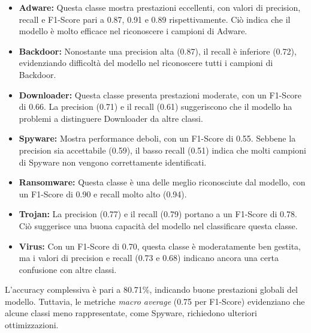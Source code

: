 \begin{itemize}
    \item \textbf{Adware:} Questa classe mostra prestazioni eccellenti, con valori di precision, recall e F1-Score pari a 0.87, 0.91 e 0.89 rispettivamente. Ciò indica che il modello è molto efficace nel riconoscere i campioni di Adware.
    \item \textbf{Backdoor:} Nonostante una precision alta (0.87), il recall è inferiore (0.72), evidenziando difficoltà del modello nel riconoscere tutti i campioni di Backdoor.
    \item \textbf{Downloader:} Questa classe presenta prestazioni moderate, con un F1-Score di 0.66. La precision (0.71) e il recall (0.61) suggeriscono che il modello ha problemi a distinguere Downloader da altre classi.
    \item \textbf{Spyware:} Mostra performance deboli, con un F1-Score di 0.55. Sebbene la precision sia accettabile (0.59), il basso recall (0.51) indica che molti campioni di Spyware non vengono correttamente identificati.
    \item \textbf{Ransomware:} Questa classe è una delle meglio riconosciute dal modello, con un F1-Score di 0.90 e recall molto alto (0.94).
    \item \textbf{Trojan:} La precision (0.77) e il recall (0.79) portano a un F1-Score di 0.78. Ciò suggerisce una buona capacità del modello nel classificare questa classe.
    \item \textbf{Virus:} Con un F1-Score di 0.70, questa classe è moderatamente ben gestita, ma i valori di precision e recall (0.73 e 0.68) indicano ancora una certa confusione con altre classi.
\end{itemize}
L'accuracy complessiva è pari a 80.71\%, indicando buone prestazioni globali del modello. Tuttavia, le metriche \textit{macro average} (0.75 per F1-Score) evidenziano che alcune classi meno rappresentate, come Spyware, richiedono ulteriori ottimizzazioni.
